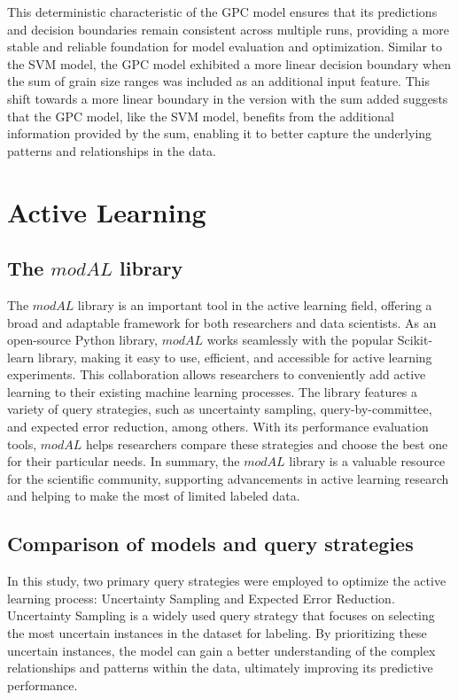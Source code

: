 \documentclass[10pt]{article}
\begin{document}
\begin{multicols}{2}
This deterministic characteristic of the GPC model ensures that its predictions and decision boundaries remain consistent across multiple runs, providing a more stable and reliable foundation for model evaluation and optimization. Similar to the SVM model, the GPC model exhibited a more linear decision boundary when the sum of grain size ranges was included as an additional input feature. This shift towards a more linear boundary in the version with the sum added suggests that the GPC model, like the SVM model, benefits from the additional information provided by the sum, enabling it to better capture the underlying patterns and relationships in the data.

\section{Active Learning}

\subsection{The $modAL$ library}

The $modAL$ library is an important tool in the active learning\cite{settles_active_2009} field, offering a broad and adaptable framework for both researchers and data scientists. As an open-source Python library, $modAL$ works seamlessly with the popular Scikit-learn library, making it easy to use, efficient, and accessible for active learning experiments. This collaboration allows researchers to conveniently add active learning to their existing machine learning processes. The library features a variety of query strategies, such as uncertainty sampling, query-by-committee, and expected error reduction, among others. With its performance evaluation tools, $modAL$ helps researchers compare these strategies and choose the best one for their particular needs. In summary, the $modAL$ library is a valuable resource for the scientific community, supporting advancements in active learning research and helping to make the most of limited labeled data.

\subsection{Comparison of models and query strategies}

In this study, two primary query strategies were employed to optimize the active learning process: Uncertainty Sampling\cite{lewis_sequential_1994} and Expected Error Reduction\cite{zhao_efficient_2021}. Uncertainty Sampling is a widely used query strategy that focuses on selecting the most uncertain instances in the dataset for labeling. By prioritizing these uncertain instances, the model can gain a better understanding of the complex relationships and patterns within the data, ultimately improving its predictive performance.


\end{multicols}
\end{document}
